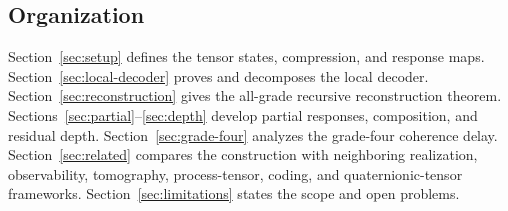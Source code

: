 \subsection{Organization}

Section~\ref{sec:setup} defines the tensor states, compression, and response maps.  Section~\ref{sec:local-decoder} proves and decomposes the local decoder.  Section~\ref{sec:reconstruction} gives the all-grade recursive reconstruction theorem.  Sections~\ref{sec:partial}--\ref{sec:depth} develop partial responses, composition, and residual depth.  Section~\ref{sec:grade-four} analyzes the grade-four coherence delay.  Section~\ref{sec:related} compares the construction with neighboring realization, observability, tomography, process-tensor, coding, and quaternionic-tensor frameworks.  Section~\ref{sec:limitations} states the scope and open problems.
